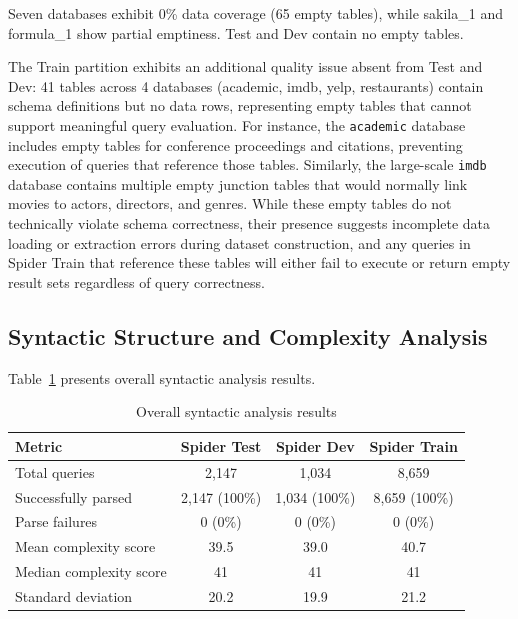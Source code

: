 \documentclass[]{einformatica}
\begin{document}
Seven databases exhibit 0\% data coverage (65 empty tables), while sakila\_1 and formula\_1 show partial emptiness. Test and Dev contain no empty tables.

The Train partition exhibits an additional quality issue absent from Test and Dev: 41 tables across 4 databases (academic, imdb, yelp, restaurants) contain schema definitions but no data rows, representing empty tables that cannot support meaningful query evaluation. For instance, the \texttt{academic} database includes empty tables for conference proceedings and citations, preventing execution of queries that reference those tables. Similarly, the large-scale \texttt{imdb} database contains multiple empty junction tables that would normally link movies to actors, directors, and genres. While these empty tables do not technically violate schema correctness, their presence suggests incomplete data loading or extraction errors during dataset construction, and any queries in Spider Train that reference these tables will either fail to execute or return empty result sets regardless of query correctness.

\subsection{Syntactic Structure and Complexity Analysis}\label{sec:syntax_results}

Table~\ref{tab:syntax_overall} presents overall syntactic analysis results.

\begin{table}[ht]
    \caption{Overall syntactic analysis results}
    \label{tab:syntax_overall}
    \centering
    \footnotesize
    \begin{tabular}{lccc}
        \toprule
        \textbf{Metric} & \textbf{Spider Test} & \textbf{Spider Dev} & \textbf{Spider Train} \\
        \midrule
        Total queries & 2,147 & 1,034 & 8,659 \\
        Successfully parsed & 2,147 (100\%) & 1,034 (100\%) & 8,659 (100\%) \\
        Parse failures & 0 (0\%) & 0 (0\%) & 0 (0\%) \\
        Mean complexity score & 39.5 & 39.0 & 40.7 \\
        Median complexity score & 41 & 41 & 41 \\
        Standard deviation & 20.2 & 19.9 & 21.2 \\
        \bottomrule
    \end{tabular}
\end{table}
\end{document}
